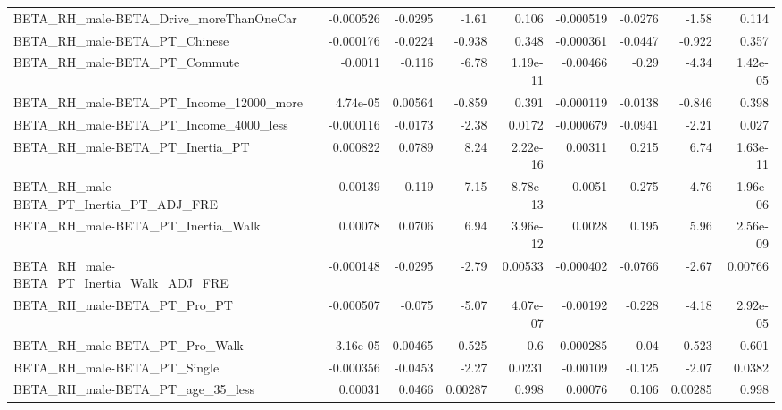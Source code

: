 \begin{tabular}{lrrrrrrrr}
BETA\_RH\_male-BETA\_Drive\_moreThanOneCar             &   -0.000526 &      -0.0295 &    -1.61 &    0.106 &  -0.000519 &     -0.0276 &        -1.58 &         0.114 \\
BETA\_RH\_male-BETA\_PT\_Chinese                       &   -0.000176 &      -0.0224 &   -0.938 &    0.348 &  -0.000361 &     -0.0447 &       -0.922 &         0.357 \\
BETA\_RH\_male-BETA\_PT\_Commute                       &     -0.0011 &       -0.116 &    -6.78 & 1.19e-11 &   -0.00466 &       -0.29 &        -4.34 &      1.42e-05 \\
BETA\_RH\_male-BETA\_PT\_Income\_12000\_more             &    4.74e-05 &      0.00564 &   -0.859 &    0.391 &  -0.000119 &     -0.0138 &       -0.846 &         0.398 \\
BETA\_RH\_male-BETA\_PT\_Income\_4000\_less              &   -0.000116 &      -0.0173 &    -2.38 &   0.0172 &  -0.000679 &     -0.0941 &        -2.21 &         0.027 \\
BETA\_RH\_male-BETA\_PT\_Inertia\_PT                    &    0.000822 &       0.0789 &     8.24 & 2.22e-16 &    0.00311 &       0.215 &         6.74 &      1.63e-11 \\
BETA\_RH\_male-BETA\_PT\_Inertia\_PT\_ADJ\_FRE            &    -0.00139 &       -0.119 &    -7.15 & 8.78e-13 &    -0.0051 &      -0.275 &        -4.76 &      1.96e-06 \\
BETA\_RH\_male-BETA\_PT\_Inertia\_Walk                  &     0.00078 &       0.0706 &     6.94 & 3.96e-12 &     0.0028 &       0.195 &         5.96 &      2.56e-09 \\
BETA\_RH\_male-BETA\_PT\_Inertia\_Walk\_ADJ\_FRE          &   -0.000148 &      -0.0295 &    -2.79 &  0.00533 &  -0.000402 &     -0.0766 &        -2.67 &       0.00766 \\
BETA\_RH\_male-BETA\_PT\_Pro\_PT                        &   -0.000507 &       -0.075 &    -5.07 & 4.07e-07 &   -0.00192 &      -0.228 &        -4.18 &      2.92e-05 \\
BETA\_RH\_male-BETA\_PT\_Pro\_Walk                      &    3.16e-05 &      0.00465 &   -0.525 &      0.6 &   0.000285 &        0.04 &       -0.523 &         0.601 \\
BETA\_RH\_male-BETA\_PT\_Single                        &   -0.000356 &      -0.0453 &    -2.27 &   0.0231 &   -0.00109 &      -0.125 &        -2.07 &        0.0382 \\
BETA\_RH\_male-BETA\_PT\_age\_35\_less                   &     0.00031 &       0.0466 &  0.00287 &    0.998 &    0.00076 &       0.106 &      0.00285 &         0.998 \\

\end{tabular}
